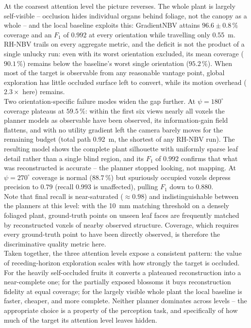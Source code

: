 At the coarsest attention level the picture reverses. The whole plant is
largely self-visible -- occlusion hides individual organs behind foliage,
not the canopy as a whole -- and the local baseline exploits this:
GradientNBV attains $96.6 \pm 0.8\,\%$ coverage and an $F_1$ of $0.992$ at
every orientation while travelling only \SI{0.55}{\metre}. RH-NBV trails on
every aggregate metric, and the deficit is not the product of a single
unlucky run: even with its worst orientation excluded, its mean coverage
($90.1\,\%$) remains below the baseline's worst single orientation
($95.2\,\%$). When most of the target is observable from any reasonable
vantage point, global exploration has little occluded surface left to
convert, while its motion overhead ($2.3\times$ here) remains.\\

Two orientation-specific failure modes widen the gap further. At
$\psi = 180^\circ$ coverage plateaus at $59.5\,\%$: within the first six
views nearly all voxels the planner models as observable have been observed,
its information-gain field flattens, and with no utility gradient left the
camera barely moves for the remaining budget (total path \SI{0.92}{\metre},
the shortest of any RH-NBV run). The resulting model shows the complete
plant silhouette with uniformly sparse leaf detail rather than a single
blind region, and its $F_1$ of $0.992$ confirms that what was reconstructed
is accurate -- the planner stopped looking, not mapping. At
$\psi = 270^\circ$ coverage is normal ($88.7\,\%$) but spuriously occupied
voxels depress precision to $0.79$ (recall $0.993$ is unaffected), pulling
$F_1$ down to $0.880$.\\

Note that final recall is near-saturated ($\approx 0.98$) and
indistinguishable between the planners at this level: with the
\SI{10}{\milli\metre} matching threshold on a densely foliaged plant,
ground-truth points on unseen leaf faces are frequently matched by
reconstructed voxels of nearby observed structure. Coverage, which requires
every ground-truth point to have been directly observed, is therefore the
discriminative quality metric here.\\

Taken together, the three attention levels expose a consistent pattern: the
value of receding-horizon exploration scales with how strongly the target is
occluded. For the heavily self-occluded fruits it converts a plateaued
reconstruction into a near-complete one; for the partially exposed blossoms
it buys reconstruction fidelity at equal coverage; for the largely visible
whole plant the local baseline is faster, cheaper, and more complete.
Neither planner dominates across levels -- the appropriate choice is a
property of the perception task, and specifically of how much of the target
its attention level leaves hidden.

